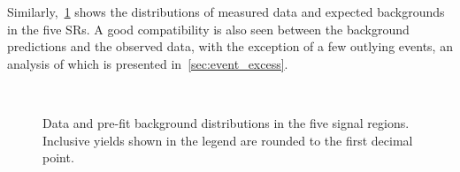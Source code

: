 Similarly,~\cref{fig:pre_fit_SR} shows the \mhnl distributions of measured data and expected backgrounds in the five SRs. A good compatibility is also seen between the background predictions and the observed data, with the exception of a few outlying events, an analysis of which is presented in~\cref{sec:event_excess}.

\begin{figure}[!ht]
    \centering
    \\
    \caption{Data and pre-fit background \mhnl distributions in the five signal regions. Inclusive yields shown in the legend are rounded to the first decimal point.}
    \label{fig:pre_fit_SR}
\end{figure}

